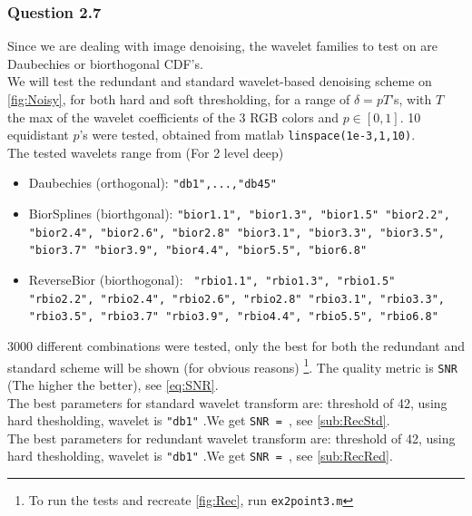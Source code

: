\documentclass[a4paper]{article}
\begin{document}
    \subsubsection{Question 2.7}
	Since we are dealing with image denoising, the wavelet families to test on are Daubechies or biorthogonal CDF's. \\

	We will test the redundant and standard wavelet-based denoising scheme on \cref{fig:Noisy}, for both hard and soft thresholding, for a range of $\delta = p T$'s, with $T$ the max of the wavelet coefficients of the 3 RGB colors and $p \in [0,1]$. 10 equidistant $p$'s were tested, obtained from matlab \texttt{linspace(\texttt{1e-3},1,10)}. \\
The tested wavelets range from (For 2 level deep)
\begin{itemize}
	\item Daubechies (orthogonal): \texttt{"db1",...,"db45"}
	\item BiorSplines (biorthgonal): \texttt{"bior1.1", "bior1.3", "bior1.5"
		"bior2.2", "bior2.4", "bior2.6", "bior2.8"
		"bior3.1", "bior3.3", "bior3.5", "bior3.7"
		"bior3.9", "bior4.4", "bior5.5", "bior6.8"}	
	\item ReverseBior (biorthogonal): \texttt{	"rbio1.1", "rbio1.3", "rbio1.5"
		"rbio2.2", "rbio2.4", "rbio2.6", "rbio2.8"	
		"rbio3.1", "rbio3.3", "rbio3.5", "rbio3.7"
		"rbio3.9", "rbio4.4", "rbio5.5", "rbio6.8"}
\end{itemize}
3000 different combinations were tested, only the best for both the redundant and standard scheme will be shown (for obvious reasons) \footnote{To run the tests and recreate \cref{fig:Rec}, run \texttt{ex2point3.m}}. The quality metric is \texttt{SNR} (The higher the better), see \cref{eq:SNR}.\\

The best parameters for standard wavelet transform are: threshold of 42, using hard thesholding, wavelet is \texttt{"db1"} .We get \texttt{SNR = }, see \cref{sub:RecStd}.\\
The best parameters for redundant wavelet transform are: threshold of 42, using hard thesholding, wavelet is \texttt{"db1"} .We get \texttt{SNR = }, see \cref{sub:RecRed}.\\
\end{document}

